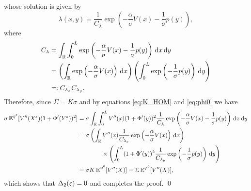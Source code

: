 \documentclass[10pt]{article}
\begin{document}
\begin{appendices}
\begin{equation}
	\end{equation}
	whose solution is given by
	\begin{equation}
	\lambda(x,y) = \frac{1}{C_\lambda} \exp \left( - \frac\alpha\sigma V(x) - \frac1\sigma p(y) \right),
	\end{equation}
	where
	\begin{equation}
	\begin{aligned}
	C_{\lambda} &= \int_{\mathbb{R}} \int_0^L \exp \left( - \frac\alpha\sigma V(x) - \frac1\sigma p(y) \right) \,\mathrm{d} x \,\mathrm{d} y \\
	&= \left( \int_{\mathbb{R}} \exp \left( - \frac\alpha\sigma V(x) \right) \,\mathrm{d} x \right) \left( \int_0^L \exp \left( - \frac1\sigma p(y) \right) \,\mathrm{d} y \right) \\
	&\eqqcolon C_{\lambda_x} C_{\lambda_y}.
	\end{aligned}
	\end{equation}
	Therefore, since $\Sigma = K\sigma$ and by equations \eqref{eq:K_HOM} and \eqref{eq:phi0} we have
	\begin{equation}
	\begin{aligned}
	\sigma \operatorname{\mathbb{E}}^{\eta^\varepsilon} [V''(X^\varepsilon) (1 + \Phi'(Y^\varepsilon))^2] &= \sigma \int_{\mathbb{R}} \int_0^L V''(x) (1 + \Phi'(y))^2 \frac{1}{C_\lambda} \exp \left( - \frac\alpha\sigma V(x) - \frac1\sigma p(y) \right) \,\mathrm{d} x \,\mathrm{d} y \\
	&= \sigma \left( \int_{\mathbb{R}} V''(x) \frac{1}{C_{\lambda_x}} \exp \left( - \frac\alpha\sigma V(x) \right) \,\mathrm{d} x \right) \\
	&\qquad \qquad \times \left( \int_0^L (1+\Phi'(y))^2 \frac{1}{C_{\lambda_y}} \exp \left( - \frac1\sigma p(y) \right) \,\mathrm{d} y \right) \\
	&= \sigma K \operatorname{\mathbb{E}}^{\varphi^0}[V''(X)] = \Sigma \operatorname{\mathbb{E}}^{\varphi^0}[V''(X)],
	\end{aligned}
	\end{equation}
	which shows that $\Delta_2(\varepsilon) = 0$ and completes the proof. \qed 
\end{appendices}




\end{document}
